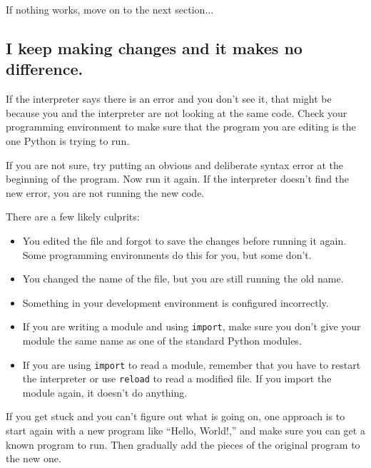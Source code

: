 \documentclass[10pt]{book}
\begin{document}
\begin{CJK}{UTF8}{gbsn}
\begin{enumerate}
\end{enumerate}

If nothing works, move on to the next section...


\subsection{I keep making changes and it makes no difference.}

If the interpreter says there is an error and you don't see it, that
might be because you and the interpreter are not looking at the same
code.  Check your programming environment to make sure that the
program you are editing is the one Python is trying to run.

If you are not sure, try putting an obvious and deliberate syntax
error at the beginning of the program.  Now run it again.  If the
interpreter doesn't find the new error, you are not running the
new code.

There are a few likely culprits:

\begin{itemize}

\item You edited the file and forgot to save the changes before
running it again.  Some programming environments do this
for you, but some don't.

\item You changed the name of the file, but you are still running
the old name.

\item Something in your development environment is configured
incorrectly.

\item If you are writing a module and using {\tt import},
make sure you don't give your module the same name as one
of the standard Python modules.

\item If you are using {\tt import} to read a module, remember
that you have to restart the interpreter or use {\tt reload}
to read a modified file.  If you import the module again, it
doesn't do anything.

\end{itemize}

If you get stuck and you can't figure out what is going on, one
approach is to start again with a new program like ``Hello, World!,''
and make sure you can get a known program to run.  Then gradually add
the pieces of the original program to the new one.



\end{CJK}
\end{document}
